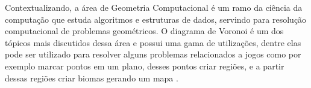 




Contextualizando, a área de Geometria Computacional é um ramo da ciência da computação que estuda algoritmos e estruturas de dados, servindo para resolução computacional de problemas geométricos. O diagrama de Voronoi é um dos tópicos mais discutidos dessa
área e possui uma gama de utilizações, dentre elas pode ser utilizado para resolver alguns problemas relacionados a jogos como por exemplo marcar pontos em um plano, desses pontos criar regiões, e a partir dessas regiões criar biomas gerando um mapa \space\cite{rodrigues_diagrama_2019}.


